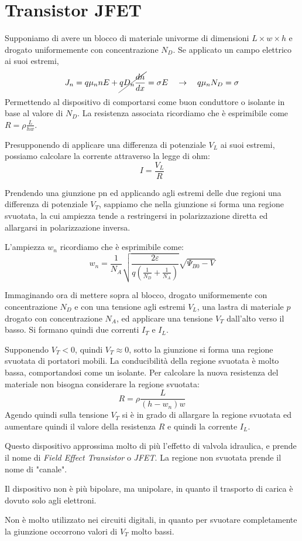 \documentclass[../template]{subfiles}
\begin{document}
\section{Transistor JFET}
Supponiamo di avere un blocco di materiale univorme di dimensioni $L \times w \times h$ e drogato uniformemente con concentrazione $N_D$.
Se applicato un campo elettrico ai suoi estremi,
\[
    J_n= q \mu_n n E + \cancel{q D_n \frac{dn}{dx}} = \sigma E \quad \rightarrow \quad q \mu_n N_D = \sigma
\]
Permettendo al dispositivo di comportarsi come buon conduttore o isolante in base al valore di $N_D$.
La resistenza associata ricordiamo che è esprimibile come $R = \rho \frac{L}{h w}$.

Presupponendo di applicare una differenza di potenziale $V_L$ ai suoi estremi, possiamo calcolare la corrente attraverso la legge di ohm:
\[
    I = \frac{V_L}{R}
\]

Prendendo una giunzione pn ed applicando agli estremi delle due regioni una differenza di potenziale $V_T$, sappiamo che nella giunzione si forma una regione svuotata, la cui ampiezza tende a restringersi in polarizzazione diretta ed allargarsi in polarizzazione inversa.

L'ampiezza $w_n$ ricordiamo che è esprimibile come:
\[
    w_n = \frac{1}{N_A} \sqrt{ \frac{2 \varepsilon}{q (\frac{1}{N_D} + \frac{1}{N_A})}}\sqrt{\Psi_{B0} - V}
\]

Immaginando ora di mettere sopra al blocco, drogato uniformemente con concentrazione $N_D$ e con una tensione agli estremi $V_L$, una lastra di materiale $p$ drogato con concentrazione $N_A$, ed applicare una tensione $V_T$ dall'alto verso il basso.
Si formano quindi due correnti $I_T$ e $I_L$.

Supponendo $V_T < 0$, quindi $V_T \approx 0$, sotto la giunzione si forma una regione svuotata di portatori mobili.
La conducibilità della regione svuotata è molto bassa, comportandosi come un isolante. Per calcolare la nuova resistenza del materiale non bisogna considerare la regione svuotata:
\[
    R = \rho \frac{L}{(h - w_n) w}
\]
Agendo quindi sulla tensione $V_T$ si è in grado di allargare la regione svuotata ed aumentare quindi il valore della resistenza $R$ e quindi la corrente $I_L$.

Questo dispositivo approssima molto di più l'effetto di valvola idraulica, e prende il nome di \textit{Field Effect Transistor} o \textit{JFET}.
La regione non svuotata prende il nome di "canale".

Il dispositivo non è più bipolare, ma unipolare, in quanto il trasporto di carica è dovuto solo agli elettroni.

Non è molto utilizzato nei circuiti digitali, in quanto per svuotare completamente la giunzione occorrono valori di $V_T$ molto bassi.
\end{document}
